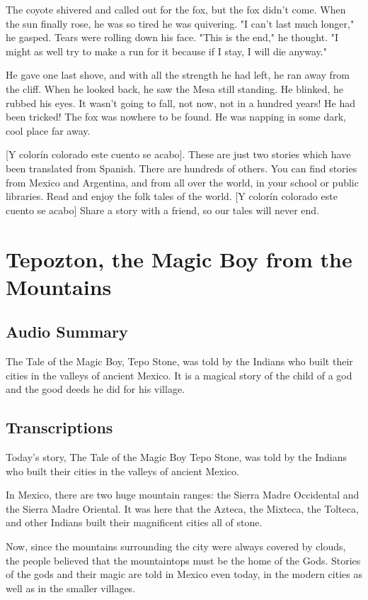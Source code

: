 The coyote shivered and called out for the fox, but the fox didn't come. When the sun finally rose, he was so tired he was quivering. "I can't last much longer," he gasped. Tears were rolling down his face. "This is the end," he thought. "I might as well try to make a run for it because if I stay, I will die anyway."

He gave one last shove, and with all the strength he had left, he ran away from the cliff. When he looked back, he saw the Mesa still standing. He blinked, he rubbed his eyes. It wasn't going to fall, not now, not in a hundred years! He had been tricked! The fox was nowhere to be found. He was napping in some dark, cool place far away.

    [Y colorín colorado este cuento se acabo]. These are just two stories which have been translated from Spanish. There are hundreds of others. You can find stories from Mexico and Argentina, and from all over the world, in your school or public libraries. Read and enjoy the folk tales of the world. [Y colorín colorado este cuento se acabo] Share a story with a friend, so our tales will never end.

\section{Tepozton, the Magic Boy from the Mountains}

\subsection{Audio Summary}

The Tale of the Magic Boy, Tepo Stone, was told by the Indians who built their cities in the valleys of ancient Mexico.
It is a magical story of the child of a god and the good deeds he did for his village.

\subsection{Transcriptions}

Today's story, The Tale of the Magic Boy Tepo Stone, was told by the Indians who built their cities in the valleys of ancient Mexico.

In Mexico, there are two huge mountain ranges: the Sierra Madre Occidental and the Sierra Madre Oriental. It was here that the Azteca, the Mixteca, the Tolteca, and other Indians built their magnificent cities all of stone.

Now, since the mountains surrounding the city were always covered by clouds, the people believed that the mountaintops must be the home of the Gods. Stories of the gods and their magic are told in Mexico even today, in the modern cities as well as in the smaller villages.


